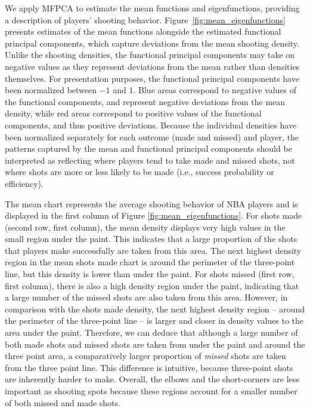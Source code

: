 \documentclass[USenglish]{article}
\theoremstyle{dgthm}
\theoremstyle{dgdef}
\begin{document}
We apply MFPCA to estimate the mean functions and eigenfunctions, providing a description of players' shooting behavior.
Figure~\ref{fig:mean_eigenfunctions} presents estimates of the mean functions alongside the estimated functional principal components, which capture deviations from the mean shooting density.
Unlike the shooting densities, the functional principal components may take on negative values as they represent deviations from the mean rather than densities themselves. For presentation purposes, the functional principal components have been normalized between $-1$ and $1$. Blue areas correspond to negative values of the functional components, and represent negative deviations from the mean density, while red areas correspond to positive values of the functional components, and thus positive deviations.
	Because the individual densities have been normalized separately for each outcome (made and missed) and player, the patterns captured by the mean and functional principal components should be interpreted as reflecting where players tend to take made and missed shots, not where shots are more or less likely to be made (i.e., success probability or efficiency).


	The mean chart represents the average shooting behavior of NBA players and is displayed in the first column of Figure \ref{fig:mean_eigenfunctions}.
		For shots made (second row, first column), the mean density displays very high values in the small region under the paint.
		This indicates that a large proportion of the shots that players make successfully are taken from this area.
		The next highest density region in the mean shots made chart is around the perimeter of the three-point line, but this density is lower than under the paint.
		For shots missed (first row, first column), there is also a high density region under the paint, indicating that a large number of the missed shots are also taken from this area.
		However, in comparison with the shots made density, the next highest density region -- around the perimeter of the three-point line -- is larger and closer in density values to the area under the paint.
		Therefore, we can deduce that although a large number of both made shots and missed shots are taken from under the paint and around the three point area, a comparatively larger proportion of \emph{missed} shots are taken from the three point line.
		This difference is intuitive, because three-point shots are inherently harder to make. Overall, the elbows and the short-corners are less important as shooting spots because these regions account for a smaller number of both missed and made shots.
\end{document}
